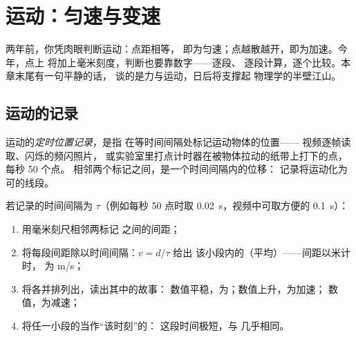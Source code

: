 \chapter{运动：匀速与变速}\label{ch:g9:uniform-varied-motion}

两年前，你凭肉眼判断运动：点距相等，
即为匀速；点越散越开，即为加速。今年，点上
将加上毫米刻度，判断也要靠数字——逐段、
逐段计算，逐个比较。本章末尾有一句平静的话，
谈的是力与运动，日后将支撑起
物理学的半壁江山。

\section{运动的记录}

\begin{definition}[定时位置记录]\label{def:g9:uniform-varied-motion:record}
运动的\emph{定时位置记录}，是指
在等时间间隔处标记运动物体的位置——
视频逐帧读取、闪烁的频闪照片，
或实验室里打点计时器在被物体拉动的纸带上打下的点，
每秒 50 个点。
相邻两个标记之间，是一个时间间隔内的位移：
记录将运动化为可的线段。
\end{definition}

\begin{method}[用数字读取记录]\label{met:g9:uniform-varied-motion:read}
若记录的时间间隔为 $\tau$（例如每秒 50 点时取
\qty{0.02}{s}，视频中可取方便的 \qty{0.1}{s}）：
\begin{enumerate}
  \item 用毫米刻尺相邻两标记
        之间的间距；
  \item 将每段间距除以时间间隔：$v = d/\tau$ 给出
        该小段内的（平均）——间距以米计时，
        为 \unit{m/s}；
  \item 将各并排列出，读出其中的故事：
        数值平稳，为；数值上升，为加速；
        数值，为减速；
  \item 将任一小段的当作“该时刻”的：
        这段时间极短，与
        几乎相同。
\end{enumerate}
\end{method}


